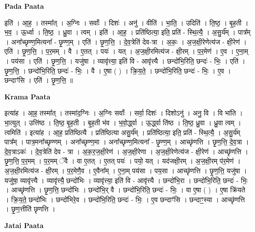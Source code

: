 \documentclass[17pt]{extarticle}
\begin{document}
\textbf{Pada Paata} \newline

इति॑ । आ॒ह॒ । तस्मा᳚त् । अ॒ग्निः । सर्वाः᳚ । दिशः॑ । अनु॑ । वीति॑ । भा॒ति॒ । उदिति॑ । ति॒ष्ठ॒ । बृ॒ह॒ती । भ॒व॒ । ऊ॒र्ध्वा । ति॒ष्ठ॒ । ध्रु॒वा । त्वम् । इति॑ । आ॒ह॒ । प्रति॑ष्ठित्या॒ इति॒ प्रति॑ - स्थि॒त्यै॒ । अ॒सु॒र्य᳚म् । पात्र᳚म् । अना᳚च्छृण्ण॒मित्यना᳚ - छृ॒ण्ण॒म् । एति॑ । छृ॒ण॒त्ति॒ । दे॒व॒त्रेति॑ देव-त्रा । अ॒कः॒ । अ॒ज॒क्षी॒रेणेत्य॑ज - क्षी॒रेण॑ । एति॑ । छृ॒ण॒त्ति॒ । प॒र॒मम् । वै । ए॒तत् । पयः॑ । यत् । अ॒ज॒क्षी॒रमित्य॑ज - क्षी॒रम् । प॒र॒मेण॑ । ए॒व । ए॒ना॒म् । पय॑सा । एति॑ । छृ॒ण॒त्ति॒ । यजु॑षा । व्यावृ॑त्त्या॒ इति॑ वि - आवृ॑त्त्यै । छन्दो॑भि॒रिति॒ छन्दः॑ - भिः॒ । एति॑ । छृ॒ण॒त्ति॒ । छन्दो॑भि॒रिति॒ छन्दः॑ - भिः॒ । वै । ए॒षा ( ) । क्रि॒य॒ते॒ । छन्दो॑भि॒रिति॒ छन्दः॑ - भिः॒ । ए॒व । छन्दाꣳ॑सि । एति॑ । छृ॒ण॒त्ति॒ ॥  \newline


\textbf{Krama Paata} \newline

इत्या॑ह । आ॒ह॒ तस्मा᳚त् । तस्मा॑द॒ग्निः । अ॒ग्निः सर्वाः᳚ । सर्वा॒ दिशः॑ । दिशोऽनु॑ । अनु॒ वि । वि भा॑ति । भा॒त्युत् । उत्ति॑ष्ठ । ति॒ष्ठ॒ बृ॒ह॒ती । बृ॒ह॒ती भ॑व । भ॒वो॒र्द्ध्वा । ऊ॒र्द्ध्वा ति॑ष्ठ । ति॒ष्ठ॒ ध्रु॒वा । ध्रु॒वा त्वम् । त्वमिति॑ । इत्या॑ह । आ॒ह॒ प्रति॑ष्ठित्यै । प्रति॑ष्ठित्या असु॒र्य᳚म् । प्रति॑ष्ठित्या॒ इति॒ प्रति॑ - स्थि॒त्यै॒ । अ॒सु॒र्य॑म् पात्र᳚म् । पात्र॒मना᳚च्छृण्णम् । अना᳚च्छृण्ण॒मा । अना᳚च्छृण्ण॒मित्यना᳚ - छृ॒ण्ण॒म् । आच्छृ॑णत्ति । छृ॒ण॒त्ति॒ दे॒व॒त्रा । दे॒व॒त्राऽकः॑ । दे॒व॒त्रेति॑ देव - त्रा । अ॒क॒र॒ज॒क्षी॒रेण॑ । अ॒ज॒क्षी॒रेणा । अ॒ज॒क्षी॒रेणेत्य॑ज - क्षी॒रेण॑ । आच्छृ॑णत्ति । छृ॒ण॒त्ति॒ प॒र॒मम् । प॒र॒मम् ॅवै । वा ए॒तत् । ए॒तत् पयः॑ । पयो॒ यत् । यद॑जक्षी॒रम् । अ॒ज॒क्षी॒रम् प॑र॒मेण॑ । अ॒ज॒क्षी॒रमित्य॑ज - क्षी॒रम् । प॒र॒मेणै॒व । ए॒वैना᳚म् । ए॒ना॒म् पय॑सा । पय॒सा । आच्छृ॑णत्ति । छृ॒ण॒त्ति॒ यजु॑षा । यजु॑षा॒ व्यावृ॑त्त्यै । व्यावृ॑त्त्यै॒ छन्दो॑भिः । व्यावृ॑त्त्या॒ इति॑ वि - आवृ॑त्त्यै । छन्दो॑भि॒रा । छन्दो॑भि॒रिति॒ छन्दः॑ - भिः॒ । आच्छृ॑णत्ति । छृ॒ण॒त्ति॒ छन्दो॑भिः । छन्दो॑भि॒र् वै । छन्दो॑भि॒रिति॒ छन्दः॑ - भिः॒ । वा ए॒षा ( ) । ए॒षा क्रि॑यते । क्रि॒य॒ते॒ छन्दो॑भिः । छन्दो॑भिरे॒व । छन्दो॑भि॒रिति॒ छन्दः॑ - भिः॒ । ए॒व छन्दाꣳ॑सि । छन्दाꣳ॒॒स्या । आच्छृ॑णत्ति । छृ॒ण॒त्तीति॑ छृणत्ति । \newline

\textbf{Jatai Paata} \newline
\end{document}
